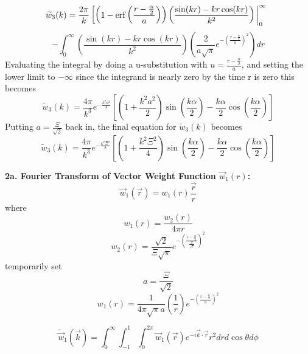 \documentclass[12pt]{article}
\begin{document}
\begin{equation}{\widetilde{w}_3(k)=\frac{2\pi}{k}\left[\left(1-\operatorname{erf}\left(\frac{r-\frac{\alpha}{2}}{a}\right)\right)\left(\frac{\sin(kr)-kr\cos(kr)}{k^2}\right)\bigg|^{\infty}_0\color{white}\right]}\end{equation} \color{black}
\begin{displaymath}{-\int_{0}^{\infty}\left(\frac{\sin(kr)-kr\cos(kr)}{k^2}\right)\left(\frac{2}{a\sqrt{\pi}}e^{-\left(\frac{r-\frac{\alpha}{2}}{a}\right)^2}\right)d{r}}\end{displaymath}
Evaluating the integral by doing a u-substitution with $u=\frac{r-\frac{\alpha}{2}}{a}$, and setting the lower limit to $-\infty$  since the integrand is nearly zero by the time r is zero this becomes
\begin{equation}{\widetilde{w}_3(k)=\frac{4\pi}{k^3}e^{-\frac{k^2a^2}{4}}\left[\left(1+\frac{k^2a^2}{2}\right)\sin\left(\frac{k\alpha}{2}\right)-\frac{k\alpha}{2}\cos\left(\frac{k\alpha}{2}\right)\right]}\end{equation}
Putting $a=\frac{\Xi}{\sqrt{2}}$ back in, the final equation for $\widetilde{w}_3(k)$ becomes
\begin{equation}{\widetilde{w}_3(k)=\frac{4\pi}{k^3}e^{-\frac{k^2\Xi^2}{8}}\left[\left(1+\frac{k^2\Xi^2}{4}\right)\sin\left(\frac{k\alpha}{2}\right)-\frac{k\alpha}{2}\cos\left(\frac{k\alpha}{2}\right)\right]}\end{equation}

\[{}\]
\textbf{2a. Fourier Transform of Vector Weight Function $\vec{w}_{1}(r)$:}
\begin{equation}{\vec{w}_1(\vec{r})=w_1(r)\frac{\vec{r}}{r}}\end{equation}
where
\begin{equation}{w_1(r)=\frac{w_2(r)}{4{\pi}r}}\end{equation}
\begin{equation}{w_2(r)=\frac{\sqrt{2}}{\Xi\sqrt{\pi}}e^{-\left(\frac{r-\frac{\alpha}{2}}{\frac{\Xi}{\sqrt{2}}}\right)^2}}\end{equation}
temporarily set 
\begin{equation}{a=\frac{\Xi}{\sqrt{2}}}\end{equation}
\begin{equation}{w_1(r)=\frac{1}{4{\pi}\sqrt{\pi}a}\left(\frac{1}{r}\right)e^{-\left(\frac{r-\frac{\alpha}{2}}{a}\right)^2}}\end{equation}

\begin{equation}{\widetilde{\vec{w}}_1(\vec{k})=\int_{0}^{\infty}\int_{-1}^{1}\int_{0}^{2\pi}\vec{w}_1(\vec{r})e^{-i\vec{k}\cdot{\vec{r}}}r^2d{r}d{\cos\theta}d{\phi}}\end{equation}
\end{document}
